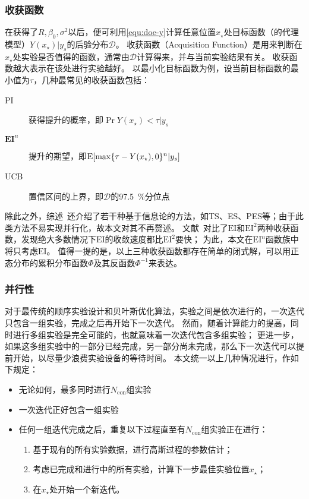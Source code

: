 \documentclass[index]{subfiles}
\begin{document}
\subsubsection{收获函数}
在获得了$R,\beta_0,\sigma^2$以后，便可利用\cref{equ:doe-y}计算任意位置$x_\star$处目标函数（的代理模型）$Y(x_\star)|y_s$的后验分布$\mathcal{D}$。
收获函数（Acquisition Function）是用来判断在$x_\star$处实验是否值得的函数，通常由$\mathcal{D}$计算得来，并与当前实验结果有关。
收获函数越大表示在该处进行实验越好。
以最小化目标函数为例，设当前目标函数的最小值为$\tau$，几种最常见的收获函数包括：
\begin{description}
  \item[PI] 获得提升的概率，即$\Pr{Y(x_\star) < \tau|y_s}$
  \item[$\mathbf{EI}^n$] 提升的期望，即$\operatorname{E}\!\left[\max\{\tau - Y(x_\star), 0\}^{n}|y_s\right]$
  \item[UCB] 置信区间的上界，即$\mathcal{D}$的\SI{97.5}{\percent}分位点
\end{description}
除此之外，综述~还介绍了若干种基于信息论的方法，如TS、ES、PES等；由于此类方法不易实现并行化，故本文对其不再赘述。
文献~对比了$\mathrm{EI}$和$\mathrm{EI}^2$两种收获函数，发现绝大多数情况下$\mathrm{EI}$的收敛速度都比$\mathrm{EI}^2$要快；
为此，本文在$\mathrm{EI}^{n}$函数族中将只考虑$\mathrm{EI}$。
值得一提的是，以上三种收获函数都存在简单的闭式解，可以用正态分布的累积分布函数$\Phi$及其反函数$\Phi^{-1}$来表达。

\subsubsection{并行性}
对于最传统的顺序实验设计和贝叶斯优化算法，实验之间是依次进行的，一次迭代只包含一组实验，完成之后再开始下一次迭代。
然而，随着计算能力的提高，同时进行多组实验是完全可能的，也就意味着一次迭代包含多组实验；
更进一步，如果这多组实验中的一部分已经完成，另一部分尚未完成，那么下一次迭代可以提前开始，以尽量少浪费实验设备的等待时间。
本文统一以上几种情况进行，作如下规定：
\begin{itemize}
  \item 无论如何，最多同时进行$N_\mathrm{con}$组实验
  \item 一次迭代正好包含一组实验
  \item 任何一组迭代完成之后，重复以下过程直至有$N_\mathrm{con}$组实验正在进行：
  \begin{enumerate}
    \item 基于现有的所有实验数据，进行高斯过程的参数估计；
    \item 考虑已完成和进行中的所有实验，计算下一步最佳实验位置$x_\star$；
    \item 在$x_\star$处开始一个新迭代。
  \end{enumerate}
\end{itemize}
\end{document}
